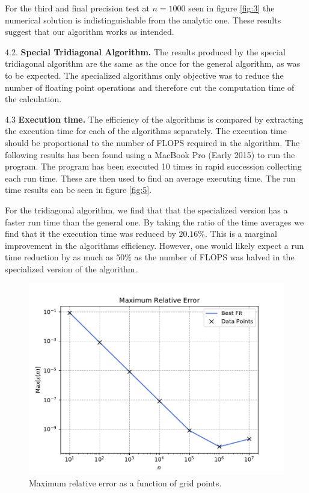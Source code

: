 \documentclass[a4paper,10pt]{article}
\begin{document}
For the third and final precision test at $n = 1000$ seen in figure \ref{fig:3} the numerical solution is indistinguishable from the analytic one. These results suggest that our algorithm works as intended.

\bigskip

4.2. \textbf{Special Tridiagonal Algorithm.}
The results produced by the special tridiagonal algorithm are the same as the once for the general algorithm, as was to be expected. The specialized algorithms only objective was to reduce the number of floating point operations and therefore cut the computation time of the calculation. 

4.3 \textbf{Execution time.}
The efficiency of the algorithms is compared by extracting the execution time for each of the algorithms separately. The execution time should be proportional to the number of FLOPS required in the algorithm. The following results has been found using a MacBook Pro (Early 2015) to run the program. The program has been executed 10 times in rapid succession collecting each run time. These are then used to find an average executing time. The run time results can be seen in figure \ref{fig:5}. 

For the tridiagonal algorithm, we find that that the specialized version has a faster run time than the general one. By taking the ratio of the time averages we find that it the execution time was reduced by $20.16\%$. This is a marginal improvement in the algorithms efficiency. However, one would likely expect a run time reduction by as much as $50\%$ as the number of FLOPS was halved in the specialized version of the algorithm. 


\begin{figure}[h]
  \centering
  \includegraphics[width=0.9\linewidth]{figures/rel_error_plot.pdf}
  \caption{Maximum relative error as a function of grid points.}
  \label{fig:4}
\end{figure}
\end{document}
